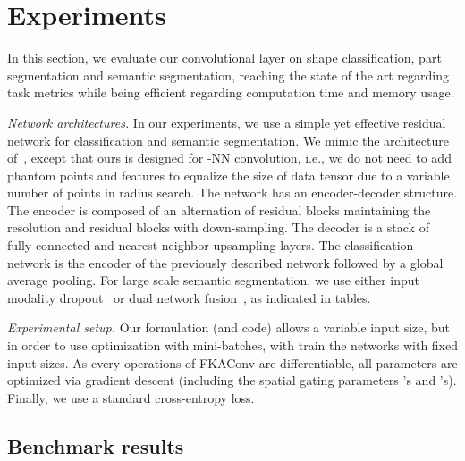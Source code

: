\section{Experiments}
\label{sec:expe}

In this section, we evaluate our convolutional layer on shape classification, part segmentation and semantic segmentation, reaching the state of the art regarding task metrics while being efficient regarding computation time and memory usage.

\textit{Network architectures.}
In our experiments, we use a simple yet effective residual network for classification and semantic segmentation. We mimic the architecture of~\cite{thomas2019kpconv}, except that ours is designed for -NN convolution, i.e., we do not need to add phantom points and features to equalize the size of data tensor due to a variable number of points in radius search.
The network has an encoder-decoder structure. The encoder is composed of an alternation of residual blocks maintaining the resolution and residual blocks with down-sampling.
The decoder is a stack of fully-connected and nearest-neighbor upsampling layers.
The classification network is the encoder of the previously described network followed by a global average pooling.
For large scale semantic segmentation, we use either input modality dropout~\cite{thomas2019kpconv} or dual network fusion~\cite{boulch2020convpoint}, as indicated in tables.

\textit{Experimental setup.}
Our formulation (and code) allows a variable input size, but in order to use optimization with mini-batches, with train the networks with fixed input sizes.
As every operations of FKAConv are differentiable, all parameters are optimized via gradient descent (including the spatial gating parameters 's and 's).
Finally, we use a standard cross-entropy loss.

\subsection{Benchmark results}

